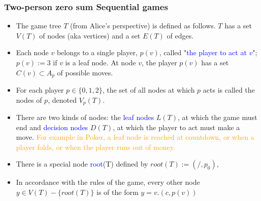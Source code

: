\documentclass[xcolor=dvipsnames]{beamer}
\begin{document}

    \begin{frame}
  \frametitle{Two-person zero sum Sequential games}
  \begin{itemize}[<+->]
    \item The game tree $T$ (from Alice's perspective) is defined as follows.
    $T$ has a set $V(T)$ of nodes (aka vertices) and a set $E(T)$ of edges.
    \item Each node $v$ belongs to a single player, $p(v)$, called "\textcolor{blue}{the player to act
    at $v$}"; $p(v) := 3$ if $v$ is a leaf node. At node $v$, the player $p(v)$ has a set
    $C(v) \subset A_p$ of possible moves.
    \item For each player $p \in \{0, 1, 2\}$,
      the set of all nodes at which $p$ acts is called the nodes of $p$,
    denoted $V_p(T)$.%
  \item There are two kinds of nodes: the \textcolor{blue}{leaf nodes} $L(T)$, at which the game must
    end and \textcolor{blue}{decision nodes} $D(T)$, at which the player to act must make a move.
    \textcolor{orange}{For example in Poker,
    a leaf node is reached at countdown, or when a player folds, or when the
    player runs out of money.}
    \item  There is a special node \textcolor{blue}{root}(T) defined by $root(T) := (/, p_0)$,

    \item In accordance with the rules of the game, every other node
      $y \in V(T)-\{root(T)\}$ is of the form $y = v.(c, p(v))$

  \end{itemize}
\end{frame}

\end{document}
